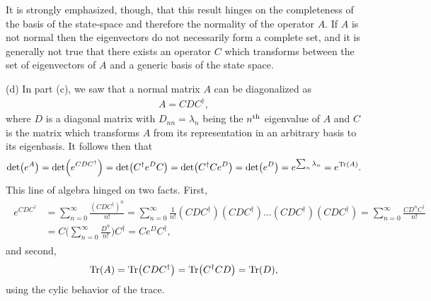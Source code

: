 {It is strongly emphasized, though, that this result hinges on the completeness of the basis of the state-space and therefore the normality of the operator $A$.
If $A$ is not normal then the eigenvectors do not necessarily form a complete set, and it is generally not true that there exists an operator $C$ which transforms between the set of eigenvectors of $A$ and a generic basis of the state space.

(d) In part (c), we saw that a normal matrix $A$ can be diagonalized as
\begin{eqnarray}
    A = C D C^{\dagger}
,\end{eqnarray}
where $D$ is a diagonal matrix with $D_{nn} = \lambda_{n}$ being the $n^{\rm th}$ eigenvalue of $A$ and $C$ is the matrix which transforms $A$ from its representation in an arbitrary basis to its eigenbasis.
It follows then that
\begin{eqnarray}
    \det(e^{A}) = \det(e^{C D C^{\dagger}}) = \det(C^{\dagger} e^{D} C) = \det(C^{\dagger} C e^{D}) = \det(e^{D}) = e^{\sum_{n} \lambda_{n}} = e^{\Tr(A)}
.\end{eqnarray}
This line of algebra hinged on two facts.
First,
\begin{eqnarray}
\begin{aligned}
    e^{C D C^{\dagger}} &= \sum_{n=0}^{\infty} \frac{(C D C^{\dagger})^{n}}{n!} = \sum_{n=0}^{\infty} \frac{1}{n!} (C D C^{\dagger}) (C D C^{\dagger}) \ldots (C D C^{\dagger}) (C D C^{\dagger}) = \sum_{n=0}^{\infty} \frac{C D^{n} C^{\dagger}}{n!} \\
                        &= C \Bigg( \sum_{n=0}^{\infty} \frac{D^{n}}{n!} \Bigg) C^{\dagger} = C e^{D} C^{\dagger}
,\end{aligned}
\end{eqnarray}
and second,
\begin{eqnarray}
    \Tr(A) = \Tr(C D C^{\dagger}) = \Tr(C^{\dagger} C D) = \Tr(D)
,\end{eqnarray}
using the cylic behavior of the trace.

}



